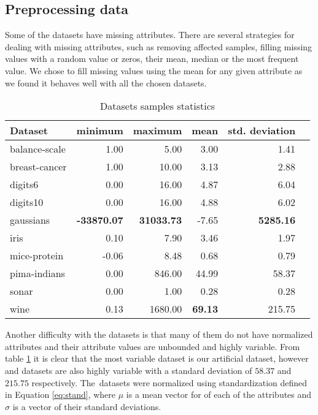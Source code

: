 \documentclass[12pt,a4paper]{report}
\begin{document}
\subsection{Preprocessing data} \label{chap:exp:preprocessing}
Some of the datasets have missing attributes. There are several strategies for dealing with missing attributes, such as removing affected samples, filling missing values with a random value or zeros, their mean, median or the most frequent value. We chose to fill missing values using the mean for any given attribute as we found it behaves well with all the chosen datasets.

\begin{table}[ht] \centering
\begin{tabular}{lrrrrr}
\hline
Dataset & minimum & maximum & mean & std. deviation \\
\hline
balance-scale           & 1.00  & 5.00    & 3.00  & 1.41 \\
breast-cancer           & 1.00  & 10.00   & 3.13  & 2.88 \\
digits6                 & 0.00  & 16.00   & 4.87  & 6.04 \\
digits10                & 0.00  & 16.00   & 4.88  & 6.02 \\
gaussians               & \textbf{-33870.07} & \textbf{31033.73} & -7.65 & \textbf{5285.16} \\
iris                    & 0.10  & 7.90    & 3.46  & 1.97 \\
mice-protein            & -0.06 & 8.48    & 0.68  & 0.79 \\
pima-indians            & 0.00  & 846.00  & 44.99 & 58.37 \\
sonar                   & 0.00  & 1.00    & 0.28  & 0.28 \\
wine                    & 0.13  & 1680.00 & \textbf{69.13} & 215.75 \\
\hline
\end{tabular}
\caption{Datasets samples statistics} \label{tab:datasets-samples}
\end{table}

Another difficulty with the datasets is that many of them do not have normalized attributes and their attribute values are unbounded and highly variable. From table \ref{tab:datasets-samples} it is clear that the most variable dataset is our artificial  dataset, however  and  datasets are also highly variable with a standard deviation of $58.37$ and $215.75$ respectively. The~datasets were normalized using standardization defined in Equation \ref{eq:stand}, where $\mu$ is a mean vector for of each of the attributes and $\sigma$ is a vector of their standard deviations.
\end{document}
